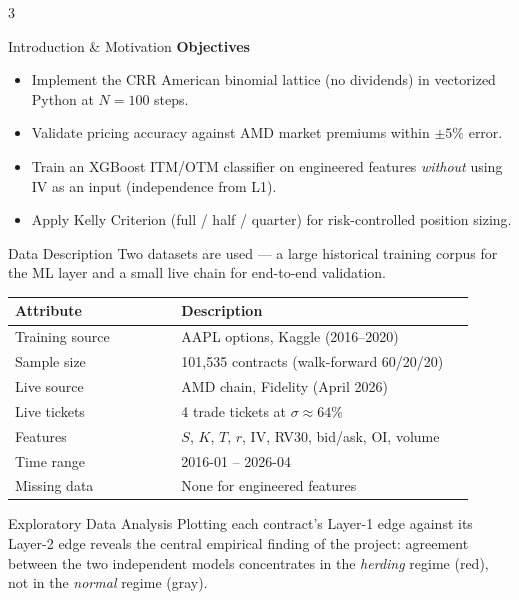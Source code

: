 \documentclass[a0,portrait]{a0poster}
\begin{document}
\begin{multicols}{3}
\begin{posterblock}{Introduction \& Motivation}
\vspace{0.3em}
\textbf{Objectives}
\begin{itemize}[leftmargin=1.4em,itemsep=4pt,topsep=4pt]
  \item Implement the CRR American binomial lattice (no dividends) in
        vectorized Python at $N=100$ steps.
  \item Validate pricing accuracy against AMD market premiums within
        $\pm 5\%$ error.
  \item Train an XGBoost ITM/OTM classifier on engineered features
        \emph{without} using IV as an input (independence from L1).
  \item Apply Kelly Criterion (full / half / quarter) for
        risk-controlled position sizing.
\end{itemize}
\end{posterblock}

\begin{posterblock}{Data Description}
Two datasets are used --- a large historical training corpus for the
ML layer and a small live chain for end-to-end validation.

\vspace{0.6em}
\renewcommand{\arraystretch}{1.35}
\begin{tabular}{@{}p{0.34\linewidth}p{0.60\linewidth}@{}}
\toprule
\textbf{Attribute} & \textbf{Description} \\
\midrule
Training source & AAPL options, Kaggle (2016--2020) \\
Sample size     & 101{,}535 contracts (walk-forward 60/20/20) \\
Live source     & AMD chain, Fidelity (April 2026) \\
Live tickets    & 4 trade tickets at $\sigma \approx 64\%$ \\
Features        & $S$, $K$, $T$, $r$, IV, RV30, bid/ask, OI, volume \\
Time range      & 2016-01 -- 2026-04 \\
Missing data    & None for engineered features \\
\bottomrule
\end{tabular}
\end{posterblock}

\begin{posterblock}{Exploratory Data Analysis}
Plotting each contract's Layer-1 edge against its Layer-2 edge reveals
the central empirical finding of the project: agreement between the
two independent models concentrates in the \emph{herding} regime
(red), not in the \emph{normal} regime (gray).


\end{posterblock}
\end{multicols}
\end{document}
